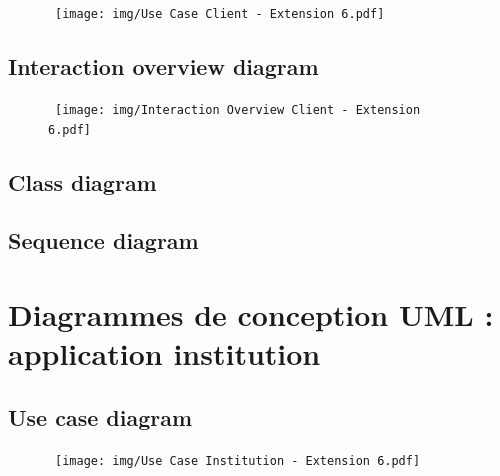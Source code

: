 \documentclass[]{report}
\begin{document}
\begin{figure}[h!]
\vspace{2cm}
\hspace{-1cm}
\hbox{
		\texttt{[image: img/Use Case Client - Extension 6.pdf]}
}
\end{figure}



\newpage

\subsection{Interaction overview diagram}

\begin{figure}[h!]
\hspace{-3cm}
\hbox{
		\texttt{[image: img/Interaction Overview Client - Extension 6.pdf]}
}
\end{figure}

\newpage

\subsection{Class diagram}

\newpage

\subsection{Sequence diagram}

\newpage




\section{Diagrammes de conception UML : application institution}




\subsection{Use case diagram}

\begin{figure}[h!]
\vspace{2cm}
\hspace{-1cm}
\hbox{
	\texttt{[image: img/Use Case Institution - Extension 6.pdf]}
}
\end{figure}
\end{document}
